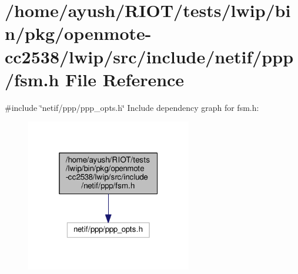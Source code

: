 \hypertarget{openmote-cc2538_2lwip_2src_2include_2netif_2ppp_2fsm_8h}{}\section{/home/ayush/\+R\+I\+O\+T/tests/lwip/bin/pkg/openmote-\/cc2538/lwip/src/include/netif/ppp/fsm.h File Reference}
\label{openmote-cc2538_2lwip_2src_2include_2netif_2ppp_2fsm_8h}
{\ttfamily \#include \char`\"{}netif/ppp/ppp\+\_\+opts.\+h\char`\"{}}\newline
Include dependency graph for fsm.\+h\+:
\nopagebreak
\begin{figure}[H]
\begin{center}
\leavevmode
\includegraphics[width=205pt]{openmote-cc2538_2lwip_2src_2include_2netif_2ppp_2fsm_8h__incl}
\end{center}
\end{figure}
